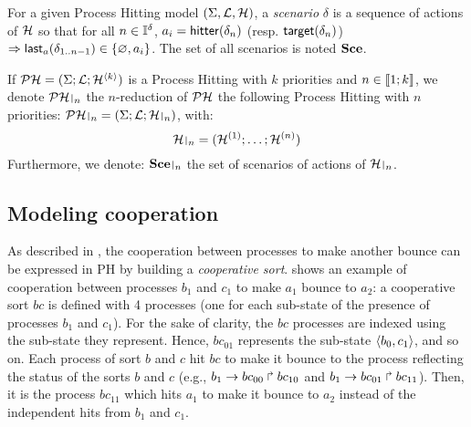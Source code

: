 \begin{definition}
\label{def:scenario}
  For a given Process Hitting model $(\Sigma,\mathcal{L},\mathcal{H})$,
  a \emph{scenario} $\delta$ is a sequence of actions of $\mathcal{H}$ so that for all $n \in \mathbb{I}^{\delta}$,
  $a_i = \mathsf{hitter}(\delta_n)$ (resp. $\mathsf{target}(\delta_n)$) $\Rightarrow \mathsf{last}_a(\delta_{1..n-1}) \in \{ \varnothing, a_i \}$.
  The set of all scenarios is noted $\mathbf{Sce}$.
\end{definition}

\begin{definition} 
  If $\mathcal{PH} = (\Sigma; \mathcal{L}; \mathcal{H}^{\langle k \rangle})$ is a Process Hitting with $k$ priorities and $n \in \llbracket 1; k \rrbracket$, we denote $\restriction{\PH}{n}$  the $n$-reduction of $\mathcal{PH}$ the following Process Hitting with $n$ priorities:
  $\restriction{\PH}{n} = (\PHs; \PHl; \restriction{\PHa}{n})$,
  with:
  $$\restriction{\PHa}{n} = (\PHa^{(1)}; \dots; \PHa^{(n)})$$
  Furthermore, we denote: $\restriction{\Sce}{n}$ the set of scenarios of actions of $\restriction{\PHa}{n}$.
\end{definition}



\subsection{Modeling cooperation}
As described in \cite{PMR10-TCSB}, the cooperation between processes to make another bounce can be
expressed in PH by building a \emph{cooperative sort}.
 shows an example of cooperation between processes $b_1$ and $c_1$ to
make $a_1$ bounce to $a_2$:
a cooperative sort $bc$ is defined with 4 processes (one for each sub-state of the presence of
processes $b_1$ and $c_1$).
For the sake of clarity, the $bc$ processes are indexed using the sub-state they represent.
Hence, $bc_{01}$ represents the sub-state $\mbox{$\langle b_0,c_1 \rangle$}$, and so on.
Each process of sort $b$ and $c$ hit $bc$ to make it bounce to the process reflecting the status of the sorts $b$
and $c$ (e.g., $b_1\rightarrow bc_{00}\Rsh bc_{10}$ and $b_1\rightarrow bc_{01}\Rsh bc_{11}$).
Then, it is the process $bc_{11}$ which hits $a_1$ to make it bounce to $a_2$ instead of the
independent hits from $b_1$ and $c_1$.



